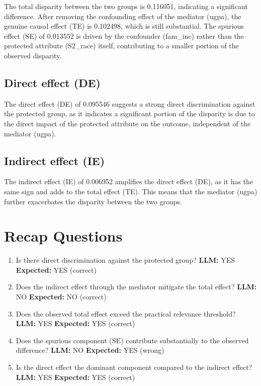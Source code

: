 \documentclass[11pt]{article}
\begin{document}
The total disparity between the two groups is 0.116051, indicating a significant difference. After removing the confounding effect of the mediator (ugpa), the genuine causal effect (TE) is 0.102498, which is still substantial. The spurious effect (SE) of 0.013552 is driven by the confounder (fam\_inc) rather than the protected attribute (S2\_race) itself, contributing to a smaller portion of the observed disparity.

\subsection{Direct effect (DE)}

The direct effect (DE) of 0.095546 suggests a strong direct discrimination against the protected group, as it indicates a significant portion of the disparity is due to the direct impact of the protected attribute on the outcome, independent of the mediator (ugpa).

\subsection{Indirect effect (IE)}

The indirect effect (IE) of 0.006952 amplifies the direct effect (DE), as it has the same sign and adds to the total effect (TE). This means that the mediator (ugpa) further exacerbates the disparity between the two groups.

\section{Recap Questions}

\begin{enumerate}
\item Is there direct discrimination against the protected group? \textbf{LLM:} YES \quad \textbf{Expected:} YES \quad (correct)
\item Does the indirect effect through the mediator mitigate the total effect? \textbf{LLM:} NO \quad \textbf{Expected:} NO \quad (correct)
\item Does the observed total effect exceed the practical relevance threshold? \textbf{LLM:} YES \quad \textbf{Expected:} YES \quad (correct)
\item Does the spurious component (SE) contribute substantially to the observed difference? \textbf{LLM:} NO \quad \textbf{Expected:} YES \quad (wrong)
\item Is the direct effect the dominant component compared to the indirect effect? \textbf{LLM:} YES \quad \textbf{Expected:} YES \quad (correct)
\end{enumerate}
\end{document}
